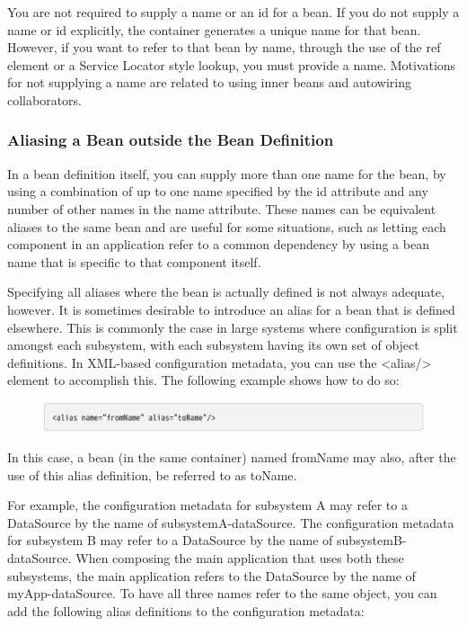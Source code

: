You are not required to supply a name or an id for a bean. If you do not supply a name or id explicitly,
the container generates a unique name for that bean. However, if you want to refer to that bean by
name, through the use of the ref element or a Service Locator style lookup, you must provide a
name. Motivations for not supplying a name are related to using inner beans and autowiring
collaborators.

\subsubsection{Aliasing a Bean outside the Bean Definition}
In a bean definition itself, you can supply more than one name for the bean, by using a
combination of up to one name specified by the id attribute and any number of other names in the
name attribute. These names can be equivalent aliases to the same bean and are useful for some
situations, such as letting each component in an application refer to a common dependency by
using a bean name that is specific to that component itself.

Specifying all aliases where the bean is actually defined is not always adequate, however. It is
sometimes desirable to introduce an alias for a bean that is defined elsewhere. This is commonly
the case in large systems where configuration is split amongst each subsystem, with each
subsystem having its own set of object definitions. In XML-based configuration metadata, you can
use the <alias/> element to accomplish this. The following example shows how to do so:

\begin{figure}[ht]
    \centering
    \includegraphics[width=1\linewidth]{./Figure/IMG_code_12.png}
\end{figure}

In this case, a bean (in the same container) named fromName may also, after the use of this alias
definition, be referred to as toName.

For example, the configuration metadata for subsystem A may refer to a DataSource by the name of
subsystemA-dataSource. The configuration metadata for subsystem B may refer to a DataSource by
the name of subsystemB-dataSource. When composing the main application that uses both these
subsystems, the main application refers to the DataSource by the name of myApp-dataSource. To have
all three names refer to the same object, you can add the following alias definitions to the
configuration metadata:

